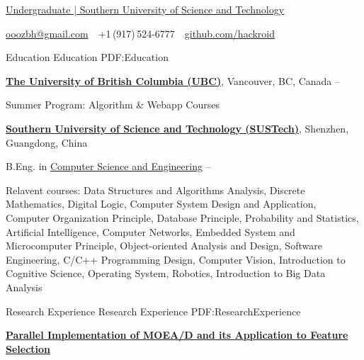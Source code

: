 \documentclass[a4paper,MMMyyyy,nonstopmode]{simpleresumecv}
\newcommand{\CVAuthor}{Bohong ZHAO}
\begin{document}

\Title{\CVAuthor}

\begin{SubTitle}
\href{https://sustech.edu.cn/}
{Undergraduate | Southern University of Science and Technology}
\par
\href{mailto:ooozbh@gmail.com}
{ooozbh@gmail.com}
\,\SubBulletSymbol\,
+1\,(917)\,524-6777
\,\SubBulletSymbol\,
\href{https://github.com/hackroid/}{github.com/hackroid}
\end{SubTitle}

\begin{Body}


\Section
{Education}
{Education}
{PDF:Education}

\Entry
\href{https://www.ubc.ca/}
{\textbf{The University of British Columbia (UBC)}},
Vancouver, BC, Canada
\hfill
{} --

\BulletItem
Summer Program: Algorithm \& Webapp Courses

\Gap
\Entry
\href{https://www.sustech.edu.cn/}
{\textbf{Southern University of Science and Technology (SUSTech)}},
Shenzhen, Guangdong, China

\Gap
\BulletItem
B.Eng. in
\href{http://cse.sustech.edu.cn/}
{Computer Science and Engineering}
\hfill
{} --
\begin{Detail}
\SubBulletItem
Relavent courses:
Data Structures and Algorithms Analysis,
Discrete Mathematics,
Digital Logic,
Computer System Design and Application,
Computer Organization Principle,
Database Principle,
Probability and Statistics,
Artificial Intelligence,
Computer Networks,
Embedded System and Microcomputer Principle,
Object-oriented Analysis and Design,
Software Engineering,
C/C++ Programming Design,
Computer Vision,
Introduction to Cognitive Science,
Operating System,
Robotics,
Introduction to Big Data Analysis
\end{Detail}


\Section
{Research Experience}
{Research Experience}
{PDF:ResearchExperience}

\Entry
\href{https://github.com/hackroid/pMOEA-D}
{\textbf{Parallel Implementation of MOEA/D and its Application to Feature Selection}}


\end{Body}
\end{document}
